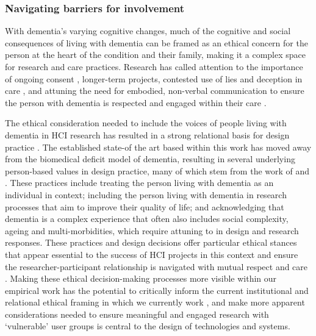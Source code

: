 \subsubsection{Navigating barriers for involvement}
\label{BL:chapter5Overview}
With dementia's varying cognitive changes, much of the cognitive and social consequences of living with dementia can be framed as an ethical concern for the person at the heart of the condition and their family, making it a complex space for research and care practices. Research has called attention to the importance of ongoing consent \citep{dewing_participatory_2007}, longer-term projects, contested use of lies and deception in care \citep{lorey_fake_2019}, and attuning the need for embodied, non-verbal communication to ensure the person with dementia is respected and engaged within their care \citep{morrissey_value_2017,kontos_embodied_2005}. 

The ethical consideration needed to include the voices of people living with dementia in HCI research has resulted in a strong relational basis for design practice \citep{wallace_enabling_2012,houben_foregrounding_2019}. The established state-of the art based within this work has moved away from the biomedical deficit model of dementia, resulting in several underlying person-based values in design practice, many of which stem from the work of \cite{kitwood_towards_1992} and \cite{brooker_what_2003}. These practices include treating the person living with dementia as an individual in context; including the person living with dementia in research processes that aim to improve their quality of life; and acknowledging that dementia is a complex experience that often also includes social complexity, ageing and multi-morbidities, which require attuning to in design and research responses. These practices and design decisions offer particular ethical stances that appear essential to the success of HCI projects in this context and ensure the researcher-participant relationship is navigated with mutual respect and care \citep{foley_care_2019}. Making these ethical decision-making processes more visible within our empirical work has the potential to critically inform the current institutional and relational ethical framing in which we currently work \citep{oyebode_mental_2005}, and make more apparent considerations needed to ensure meaningful and engaged research with ‘vulnerable’ user groups is central to the design of technologies and systems.

